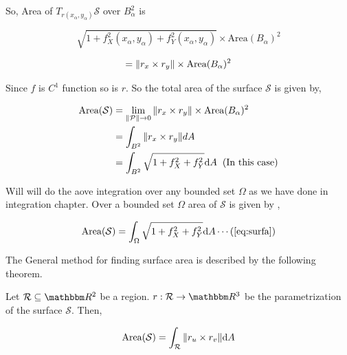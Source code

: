 \documentclass[Analysis-3]{subfiles}
\begin{document}
So, Area of $T_{r(x_{\alpha},y_{\alpha})} \mathcal{S}$ over $B_{\alpha}^2$ is 

$$\sqrt{1 + f_X^2(x_{\alpha},y_{\alpha}) + f_Y^2(x_{\alpha},y_{\alpha})} \times \text{Area}(B_{\alpha})^2$$

$$ = \norm{r_x \times r_y} \times \text{Area}(B_{\alpha})^2$$

\pagebreak

Since $f$ is $C^1$ function so is $r$. So the total area of the surface $\mathcal{S}$ is given by, 

\begin{align*}
    \text{Area} (\mathcal{S}) &= \lim_{\norm{\mathcal{P}} \to 0} \norm{r_x \times r_y} \times \text{Area}(B_{\alpha})^2 \\
    &= \int_{B^2} \norm{r_x \times r_y} dA \\
    &= \int_{B^2} \sqrt{1 + f_X^2 +f_Y^2} \dd A \hspace{0.2cm}(\text{In this case})
\end{align*}

Will will do the aove integration over any bounded set $\Omega$ as we have done in  integration chapter. Over a bounded set $\Omega$ area of $\mathcal{S}$ is given by , 

\[\text{Area} (\mathcal{S}) =  \int_{\Omega} \sqrt{1 + f_X^2 +f_Y^2} \dd A \label{eq:surfa} \cdots  (\ref{eq:surfa})\]

The General method for finding surface area is described by the following theorem.

\begin{Thm}{}{}
    Let $\mathcal{R} \subseteq \R^2$ be a region. $r : \mathcal{R} \to \R^3$ be the parametrization of the surface $\mathcal{S}$. Then,

    \[\text{Area}(\mathcal{S}) = \int_{\mathcal{R}} \norm{r_u \times r_v} \dd A\]
\end{Thm}
\end{document}
